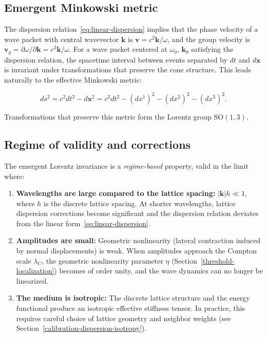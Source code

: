 \subsection{Emergent Minkowski metric}

The dispersion relation~\eqref{eq:linear-dispersion} implies that the phase
velocity of a wave packet with central wavevector $\mathbf{k}$ is $\mathbf{v}
= c^2 \mathbf{k} / \omega$, and the group velocity is $\mathbf{v}_g = \partial
\omega / \partial \mathbf{k} = c^2 \mathbf{k} / \omega$. For a wave packet
centered at $\omega_0$, $\mathbf{k}_0$ satisfying the dispersion relation, the
spacetime interval between events separated by $dt$ and $d\mathbf{x}$ is
invariant under transformations that preserve the cone structure. This leads
naturally to the effective Minkowski metric:

\begin{equation}
ds^2 = c^2 dt^2 - d\mathbf{x}^2 = c^2 dt^2 - (dx^1)^2 - (dx^2)^2 - (dx^3)^2.
\label{eq:minkowski-metric}
\end{equation}

Transformations that preserve this metric form the Lorentz group $\mathrm{SO}(1,3)$.

\subsection{Regime of validity and corrections}

The emergent Lorentz invariance is a \emph{regime-based} property, valid in the
limit where:

\begin{enumerate}
\item \textbf{Wavelengths are large compared to the lattice spacing:}
  $|\mathbf{k}| h \ll 1$, where $h$ is the discrete lattice spacing. At shorter
  wavelengths, lattice dispersion corrections become significant and the
  dispersion relation deviates from the linear form~\eqref{eq:linear-dispersion}.

\item \textbf{Amplitudes are small:} Geometric nonlinearity (lateral contraction
  induced by normal displacements) is weak. When amplitudes approach the
  Compton scale $\lambda_C$, the geometric nonlinearity parameter $\eta$
  (Section~\ref{threshold-localization}) becomes of order unity, and the wave
  dynamics can no longer be linearized.

\item \textbf{The medium is isotropic:} The discrete lattice structure and the
  energy functional produce an isotropic effective stiffness tensor. In
  practice, this requires careful choice of lattice geometry and neighbor
  weights (see Section~\ref{calibration-dispersion-isotropy}).
\end{enumerate}

